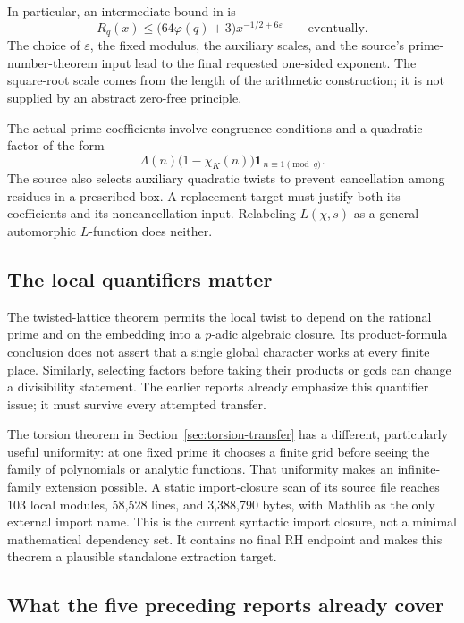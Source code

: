 In particular, an intermediate bound in
 is
\[
 R_q(x)\le \bigl(64\varphi(q)+3\bigr)x^{-1/2+6\varepsilon}
 \qquad\text{eventually}.
\]
The choice of \(\varepsilon\), the fixed modulus, the auxiliary scales,
and the source's prime-number-theorem input lead to the final requested
one-sided exponent. The square-root scale comes from the length of
the arithmetic construction; it is not supplied by an abstract
zero-free principle.

The actual prime coefficients involve congruence conditions and a
quadratic factor of the form
\[
 \Lambda(n)\bigl(1-\chi_K(n)\bigr)
             \mathbf 1_{\,n\equiv1\pmod q}.
\]
The source also selects auxiliary quadratic twists to prevent cancellation
among residues in a prescribed box. A replacement target must justify
both its coefficients and its noncancellation input. Relabeling
\(L(\chi,s)\) as a general automorphic \(L\)-function does neither.

\subsection{The local quantifiers matter}

The twisted-lattice theorem permits the local twist to depend on the
rational prime and on the embedding into a \(p\)-adic algebraic closure.
Its product-formula conclusion does not assert that a single global
character works at every finite place. Similarly, selecting factors
before taking their products or gcds can change a divisibility statement.
The earlier reports already emphasize this quantifier issue; it must
survive every attempted transfer.

The torsion theorem in Section~\ref{sec:torsion-transfer} has a different,
particularly useful uniformity: at one fixed prime it chooses a finite
grid before seeing the family of polynomials or analytic functions.
That uniformity makes an infinite-family extension possible. A static
import-closure scan of its source file reaches 103 local modules,
58,528 lines, and 3,388,790 bytes, with Mathlib as the only external
import name. This is the current syntactic import closure, not a
minimal mathematical dependency set. It contains no final RH endpoint
and makes this theorem a plausible standalone extraction target.

\subsection{What the five preceding reports already cover}
\label{sec:prior}

